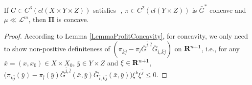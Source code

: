 	
	\begin{corollary}\label{bar{G}^*-Concavity}
		If $G \in C^3(cl(X\times Y \times Z)
		)$ satisfies \Gzero-\Gsix,  $\pi \in C^2( cl( Y \times Z)
		)$ is $\bar{G}^*$-concave and $\mu\ll \mathcal{L}^m$, then $\pmb \Pi$ is concave. 
	\end{corollary}
	
	\begin{proof}%
		According to Lemma \ref{LemmaProfitConcavity}, for concavity, we only need to show non-positive definiteness of $(\pi_{\bar{k}\bar{j}}- \pi_{\bar{l}} \bar{G}^{\bar i,\bar l}\bar{G}_{\bar{i},\bar{k}\bar{j}})$ on ${\mathbf R}^{n+1}$, i.e., for any $\bar{x} = (x,x_0) \in X \times X_0$,  $\bar{y} \in Y\times Z$ and $\xi \in {\mathbf R}^{n+1} $, $\big(\pi_{\bar{k}\bar{j}}(\bar{y})- \pi_{\bar{l}}(\bar{y}) \bar{G}^{\bar i,\bar l}(\bar{x}, \bar{y})\bar{G}_{\bar{i},\bar{k}\bar{j}}(\bar{x}, \bar{y})\big)\xi^{\bar{k}}\xi^{\bar{j}} \le 0$.
		

\end{proof}
